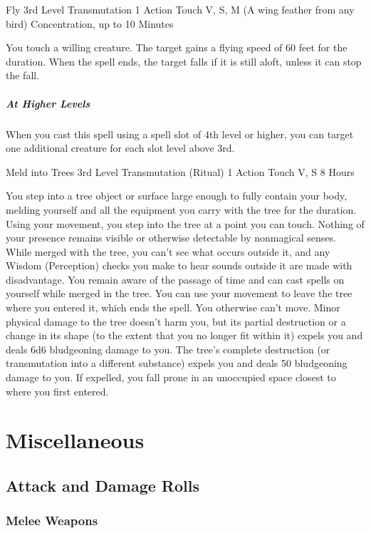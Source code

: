 \documentclass[letterpaper,openany,oneside,twocolumn]{book}
\begin{document}
\DndSpellHeader
  {Fly}
  {3rd Level Transmutation}
  {1 Action}
  {Touch}
  {V, S, M (A wing feather from any bird)}
  {Concentration, up to 10 Minutes}
  
You touch a willing creature. The target gains a flying speed of 60 feet for the duration. When the spell ends, the target falls if it is still aloft, unless it can stop the fall.

\subparagraph*{At Higher Levels} When you cast this spell using a spell slot of 4th level or higher, you can target one additional creature for each slot level above 3rd.

\DndSpellHeader
  {Meld into Trees}
  {3rd Level Transmutation (Ritual)}
  {1 Action}
  {Touch}
  {V, S}
  {8 Hours}
  
You step into a tree object or surface large enough to fully contain your body, melding yourself and all the equipment you carry with the tree for the duration. Using your movement, you step into the tree at a point you can touch. Nothing of your presence remains visible or otherwise detectable by nonmagical senses.
While merged with the tree, you can't see what occurs outside it, and any Wisdom (Perception) checks you make to hear sounds outside it are made with disadvantage. You remain aware of the passage of time and can cast spells on yourself while merged in the tree. You can use your movement to leave the tree where you entered it, which ends the spell. You otherwise can't move.
Minor physical damage to the tree doesn't harm you, but its partial destruction or a change in its shape (to the extent that you no longer fit within it) expels you and deals 6d6 bludgeoning damage to you. The tree's complete destruction (or transmutation into a different substance) expels you and deals 50 bludgeoning damage to you. If expelled, you fall prone in an unoccupied space closest to where you first entered.

\vfill\eject

\section*{Miscellaneous}
\subsection*{Attack and Damage Rolls}
\subsubsection*{Melee Weapons}
\end{document}

